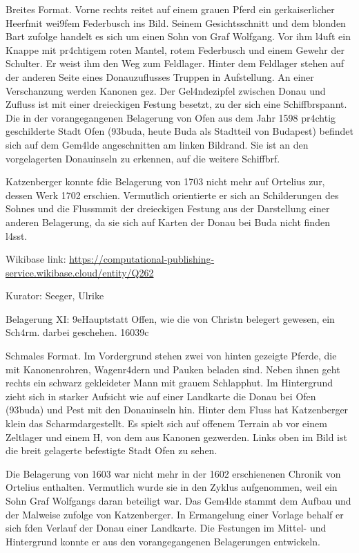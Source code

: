 \documentclass[
  letterpaper,
]{book}
\begin{document}
Breites Format. Vorne rechts reitet auf einem grauen Pferd ein
ger\xbcsteter kaiserlicher Heerf\xbchrer mit wei\x9fem
Federbusch ins Bild. Seinem Gesichtsschnitt und dem blonden Bart zufolge
handelt es sich um einen Sohn von Graf Wolfgang. Vor ihm l\xa4uft
ein Knappe mit pr\xa4chtigem roten Mantel, rotem Federbusch und
einem Gewehr \xbcber der Schulter. Er weist ihm den Weg zum
Feldlager. Hinter dem Feldlager stehen auf der anderen Seite eines
Donauzuflusses Truppen in Aufstellung. An einer Verschanzung werden
Kanonen gez\xbcndet. Der Gel\xa4ndezipfel zwischen Donau und
Zufluss ist mit einer dreieckigen Festung besetzt, zu der sich eine
Schiffbr\xbccke spannt. Die in der vorangegangenen Belagerung von
Ofen aus dem Jahr 1598 pr\xa4chtig geschilderte Stadt Ofen
(\x93buda, heute Buda als Stadtteil von Budapest) befindet sich auf
dem Gem\xa4lde angeschnitten am linken Bildrand. Sie ist an den
vorgelagerten Donauinseln zu erkennen, auf die weitere
Schiffbr\xbccken f\xbchren.

Katzenberger konnte f\xbcr die Belagerung von 1703 nicht mehr auf
Ortelius zur\xbcckgreifen, dessen Werk 1702 erschien. Vermutlich
orientierte er sich an Schilderungen des Sohnes und \xbcbernahm die
Flussm\xbcndung mit der dreieckigen Festung aus der Darstellung
einer anderen Belagerung, da sie sich auf Karten der Donau bei Buda
nicht finden l\xa4sst.

Wikibase link:
\url{https://computational-publishing-service.wikibase.cloud/entity/Q262}

Kurator: Seeger, Ulrike

Belagerung XI: \x9eHauptstatt Offen, wie die von Christn
belegert gewesen, ein Sch\xa4rm\xbctzell. darbei geschehen.
1603\x9c

Schmales Format. Im Vordergrund stehen zwei von hinten gezeigte Pferde,
die mit Kanonenrohren, Wagenr\xa4dern und Pauken beladen sind. Neben
ihnen geht rechts ein schwarz gekleideter Mann mit grauem Schlapphut. Im
Hintergrund zieht sich in starker Aufsicht wie auf einer Landkarte die
Donau bei Ofen (\x93buda) und Pest mit den Donauinseln hin. Hinter
dem Fluss hat Katzenberger klein das Scharm\xbctzel dargestellt. Es
spielt sich auf offenem Terrain ab vor einem Zeltlager und einem
H\xbcgel, von dem aus Kanonen gez\xbcndet werden. Links oben im
Bild ist die breit gelagerte befestigte Stadt Ofen zu sehen.

Die Belagerung von 1603 war nicht mehr in der 1602 erschienenen Chronik
von Ortelius enthalten. Vermutlich wurde sie in den Zyklus aufgenommen,
weil ein Sohn Graf Wolfgangs daran beteiligt war. Das Gem\xa4lde
stammt dem Aufbau und der Malweise zufolge von Katzenberger. In
Ermangelung einer Vorlage behalf er sich f\xbcr den Verlauf der
Donau einer Landkarte. Die Festungen im Mittel- und Hintergrund konnte
er aus den vorangegangenen Belagerungen entwickeln.
\end{document}
